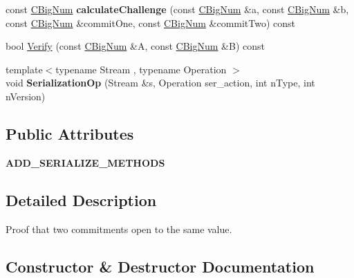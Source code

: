\begin{DoxyCompactItemize}
const \mbox{\hyperlink{class_c_big_num}{C\+Big\+Num}} {\bfseries calculate\+Challenge} (const \mbox{\hyperlink{class_c_big_num}{C\+Big\+Num}} \&a, const \mbox{\hyperlink{class_c_big_num}{C\+Big\+Num}} \&b, const \mbox{\hyperlink{class_c_big_num}{C\+Big\+Num}} \&commit\+One, const \mbox{\hyperlink{class_c_big_num}{C\+Big\+Num}} \&commit\+Two) const
\item 
bool \mbox{\hyperlink{classlibzerocoin_1_1_commitment_proof_of_knowledge_a36196236b6f40da17e1dd4fcb42c6794}{Verify}} (const \mbox{\hyperlink{class_c_big_num}{C\+Big\+Num}} \&A, const \mbox{\hyperlink{class_c_big_num}{C\+Big\+Num}} \&B) const
\item 
\mbox{\label{classlibzerocoin_1_1_commitment_proof_of_knowledge_a3494503ecf52f0a2f3b027ed2b38ae18}} 
{\footnotesize template$<$typename Stream , typename Operation $>$ }\\void {\bfseries Serialization\+Op} (Stream \&s, Operation ser\+\_\+action, int n\+Type, int n\+Version)
\end{DoxyCompactItemize}
\subsection*{Public Attributes}
\begin{DoxyCompactItemize}
\item 
\mbox{\label{classlibzerocoin_1_1_commitment_proof_of_knowledge_aa9259ac6ef4df3c79808f1f1f6888d42}} 
{\bfseries A\+D\+D\+\_\+\+S\+E\+R\+I\+A\+L\+I\+Z\+E\+\_\+\+M\+E\+T\+H\+O\+DS}
\end{DoxyCompactItemize}


\subsection{Detailed Description}
Proof that two commitments open to the same value. 

\subsection{Constructor \& Destructor Documentation}
\mbox{\label{classlibzerocoin_1_1_commitment_proof_of_knowledge_af66449f2c4c0cb88d19cb409b67b4cff}} 
